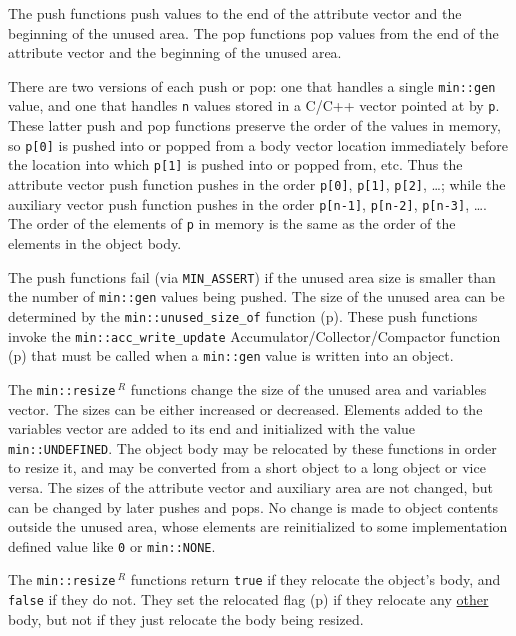 \documentclass[12pt]{article}
\newcommand{\pagref}[1]{p\pageref{#1}}
\newcommand{\EOL}{\penalty \exhyphenpenalty}
\newcommand{\REL}{$\,^R$}
\begin{document}
The push functions push values to the end of the attribute vector
and the beginning of the unused area.  The pop functions pop values
from the end of the attribute vector and the beginning of the unused
area.

There are two versions of each push or pop: one that
handles a single {\tt min::gen} value, and one that handles
{\tt n} values stored in a C/C++ vector pointed at by {\tt p}.
These latter push and pop functions preserve the order of the values in memory,
so \verb|p[0]| is pushed into or popped from a body vector location immediately
before the location into which \verb|p[1]| is pushed into or popped from, etc.
Thus the attribute vector push function pushes
in the order \verb|p[0]|, \verb|p[1]|, \verb|p[2]|, \ldots; while the
auxiliary vector push function pushes
in the order \verb|p[n-1]|, \verb|p[n-2]|, \verb|p[n-3]|, \ldots.
The order of the elements of {\tt p} in memory is the same
as the order of the elements in the object body.

The push functions fail (via \verb|MIN_ASSERT|) if the unused
area size is smaller
than the number of {\tt min::gen} values being pushed.
The size of the unused area can be determined by the
\verb|min::unused_size_of| function
(\pagref{MIN::UNUSED_SIZE_OF_OBJ_VEC_PTR}).
These push functions invoke the
{\tt min::\EOL acc\_\EOL write\_\EOL update}
Accumu\-la\-tor/\EOL Col\-lec\-tor/\EOL Com\-pac\-tor function
(\pagref{MUP::ACC_WRITE_GEN_UPDATE}) that must
be called when a \verb|min::gen| value is written into an object.

The {\tt min::resize\REL} functions change the size of the unused
area and variables vector.  The sizes can be either increased or
decreased.  Elements added to the variables vector are added to
its end and initialized with the value {\tt min::\EOL UNDEFINED}.
The object body may be relocated by these functions in order to
resize it, and may be converted from a short object to a long
object or vice versa.  The sizes of the attribute vector and
auxiliary area are not changed, but can be changed by later pushes
and pops.
No change is made to object contents outside the unused
area, whose elements are reinitialized to some implementation defined
value like \verb|0| or \verb|min::NONE|.

The {\tt min::resize\REL} functions return \verb|true| if they
relocate the object's body, and \verb|false| if they do not.
They set the relocated flag (\pagref{RELOCATED-FLAG}) if they
relocate any \underline{other} body, but not if they just relocate
the body being resized.
\end{document}
